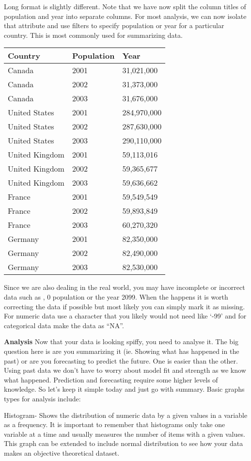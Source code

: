 \documentclass[]{article}
\begin{document}
Long format is slightly different. Note that we have now split the
column titles of population and year into separate columns. For most
analysis, we can now isolate that attribute and use filters to specify
population or year for a particular country. This is most commonly used
for summarizing data.

\begin{longtable}[]{@{}lll@{}}
\toprule
Country & Population & Year\tabularnewline
\midrule
\endhead
Canada & 2001 & 31,021,000\tabularnewline
Canada & 2002 & 31,373,000\tabularnewline
Canada & 2003 & 31,676,000\tabularnewline
United States & 2001 & 284,970,000\tabularnewline
United States & 2002 & 287,630,000\tabularnewline
United States & 2003 & 290,110,000\tabularnewline
United Kingdom & 2001 & 59,113,016\tabularnewline
United Kingdom & 2002 & 59,365,677\tabularnewline
United Kingdom & 2003 & 59,636,662\tabularnewline
France & 2001 & 59,549,549\tabularnewline
France & 2002 & 59,893,849\tabularnewline
France & 2003 & 60,270,320\tabularnewline
Germany & 2001 & 82,350,000\tabularnewline
Germany & 2002 & 82,490,000\tabularnewline
Germany & 2003 & 82,530,000\tabularnewline
\bottomrule
\end{longtable}

Since we are also dealing in the real world, you may have incomplete or
incorrect data such as , 0 population or the year 2099. When the happens
it is worth correcting the data if possible but most likely you can
simply mark it as missing. For numeric data use a character that you
likely would not need like `-99' and for categorical data make the data
as ``NA''.

\textbf{Analysis} Now that your data is looking spiffy, you need to
analyse it. The big question here is are you summarizing it (ie. Showing
what has happened in the past) or are you forecasting to predict the
future. One is easier than the other. Using past data we don't have to
worry about model fit and strength as we know what happened. Prediction
and forecasting require some higher levels of knowledge. So let's keep
it simple today and just go with summary. Basic graphs types for
analysis include:

Histogram- Shows the distribution of numeric data by a given values in a
variable as a frequency. It is important to remember that histograms
only take one variable at a time and usually measures the number of
items with a given values. This graph can be extended to include normal
distribution to see how your data makes an objective theoretical
dataset.
\end{document}
